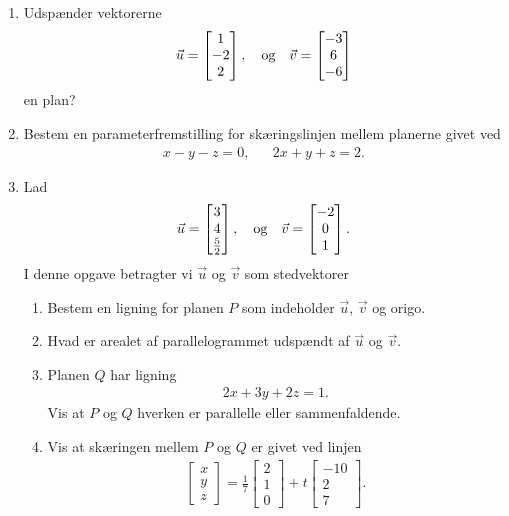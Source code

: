 \begin{enumerate}
	\item Udspænder vektorerne
		\begin{align*}
	\vec{u}=\begin{bmatrix}
	1\\-2\\2
	\end{bmatrix},\quad \textup{og}\quad \vec{v}=\begin{bmatrix}
	-3\\6\\-6
	\end{bmatrix}
	\end{align*}
	en plan?
	
	\item Bestem en parameterfremstilling for skæringslinjen mellem planerne givet ved
	\begin{align*}
	x-y-z=0,&&2x+y+z=2.
	\end{align*}
	
	
	\item Lad 
	\begin{align*}
	\vec{u}=\begin{bmatrix}
	3\\4\\\frac{5}{2}
	\end{bmatrix},\quad \textup{og}\quad \vec{v}=\begin{bmatrix}
	-2\\0\\1
	\end{bmatrix}.
	\end{align*}
	I denne opgave betragter vi $\vec{u}$ og $\vec{v}$ som stedvektorer
	\begin{enumerate}
		\item Bestem en ligning for planen $P$ som indeholder $\vec{u}$, $\vec{v}$ og origo.
		\item Hvad er arealet af parallelogrammet udspændt af $\vec{u}$ og $\vec{v}$.
		\item Planen $Q$ har ligning 
		\begin{align*}
		2x+3y+2z=1.
		\end{align*}
		Vis at $P$ og $Q$ hverken er parallelle eller sammenfaldende.
		\item Vis at skæringen mellem $P$ og $Q$ er givet ved linjen
		\begin{align*}
		\begin{bmatrix}
		x\\y\\z
		\end{bmatrix}= \frac{1}{7}\begin{bmatrix}
		2\\1\\0
		\end{bmatrix}+t \begin{bmatrix}
		-10\\2\\7
		\end{bmatrix}.
		\end{align*}
	\end{enumerate}


\end{enumerate}
